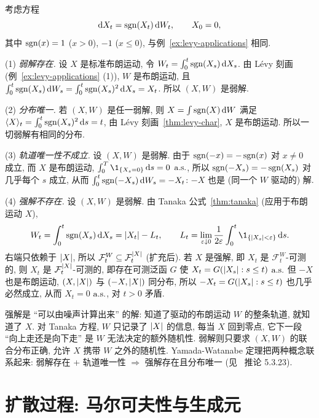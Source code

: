\begin{example}[Tanaka 方程]\label{ex:tanaka-sde}
考虑方程
\[
\mathop{}\!\mathrm{d} X_t=\operatorname{sgn}(X_t)\mathop{}\!\mathrm{d} W_t,\qquad X_0=0,
\]
其中 $\operatorname{sgn}(x)=1$ ($x>0$), $-1$ ($x\le0$), 与例~\ref{ex:levy-applications} 相同.

(1) \emph{弱解存在.} 设 $X$ 是标准布朗运动, 令 $W_t=\int_0^t\operatorname{sgn}(X_s)\mathop{}\!\mathrm{d} X_s$. 由 L\'evy 刻画 (例~\ref{ex:levy-applications} (1)), $W$ 是布朗运动, 且 $\int_0^t\operatorname{sgn}(X_s)\mathop{}\!\mathrm{d} W_s=\int_0^t\operatorname{sgn}(X_s)^2\mathop{}\!\mathrm{d} X_s=X_t$. 所以 $(X,W)$ 是弱解.

(2) \emph{分布唯一.} 若 $(X,W)$ 是任一弱解, 则 $X=\int\operatorname{sgn}(X)\mathop{}\!\mathrm{d} W$ 满足 $\langle X\rangle_t=\int_0^t\operatorname{sgn}(X_s)^2\mathop{}\!\mathrm{d} s=t$, 由 L\'evy 刻画~\ref{thm:levy-char}, $X$ 是布朗运动. 所以一切弱解有相同的分布.

(3) \emph{轨道唯一性不成立.} 设 $(X,W)$ 是弱解. 由于 $\operatorname{sgn}(-x)=-\operatorname{sgn}(x)$ 对 $x\ne0$ 成立, 而 $X$ 是布朗运动, $\int_0^T\1_{\{X_s=0\}}\dd s=0$ $\text{a.s.}$, 所以 $\operatorname{sgn}(-X_s)=-\operatorname{sgn}(X_s)$ 对几乎每个 $s$ 成立, 从而 $\int_0^t\operatorname{sgn}(-X_s)\mathop{}\!\mathrm{d} W_s=-X_t$: $-X$ 也是 (同一个 $W$ 驱动的) 解.

(4) \emph{强解不存在.} 设 $(X,W)$ 是弱解. 由 Tanaka 公式~\ref{thm:tanaka} (应用于布朗运动 $X$),
\[
W_t=\int_0^t\sgn(X_s)\dd X_s=\abs{X_t}-L_t,\qquad L_t=\lim_{\varepsilon\downarrow0}\frac{1}{2\varepsilon}\int_0^t\1_{\{\abs{X_s}<\varepsilon\}}\dd s.
\]
右端只依赖于 $\lvert X\rvert$, 所以 $\mathcal{F}^W_t\subseteq\mathcal{F}^{\lvert X\rvert}_t$ (扩充后). 若 $X$ 是强解, 即 $X_t$ 是 $\mathcal{F}^W_t$-可测的, 则 $X_t$ 是 $\mathcal{F}^{\lvert X\rvert}_t$-可测的, 即存在可测泛函 $G$ 使 $X_t=G(\lvert X_s\rvert:s\le t)$ $\text{a.s.}$ 但 $-X$ 也是布朗运动, $(X,\lvert X\rvert)$ 与 $(-X,\lvert X\rvert)$ 同分布, 所以 $-X_t=G(\lvert X_s\rvert:s\le t)$ 也几乎必然成立, 从而 $X_t=0$ $\text{a.s.}$, 对 $t>0$ 矛盾.
\end{example}

\begin{intuition}
强解是 ``可以由噪声计算出来'' 的解: 知道了驱动的布朗运动 $W$ 的整条轨道, 就知道了 $X$. 对 Tanaka 方程, $W$ 只记录了 $\lvert X\rvert$ 的信息, 每当 $X$ 回到零点, 它下一段 ``向上走还是向下走'' 是 $W$ 无法决定的额外随机性. 弱解则只要求 $(X,W)$ 的联合分布正确, 允许 $X$ 携带 $W$ 之外的随机性. Yamada-Watanabe 定理把两种概念联系起来: 弱解存在 + 轨道唯一性 $\Rightarrow$ 强解存在且分布唯一 (见~\cite{karatzas} 推论 5.3.23).
\end{intuition}

\section{扩散过程: 马尔可夫性与生成元}
\label{sec:6-3}

